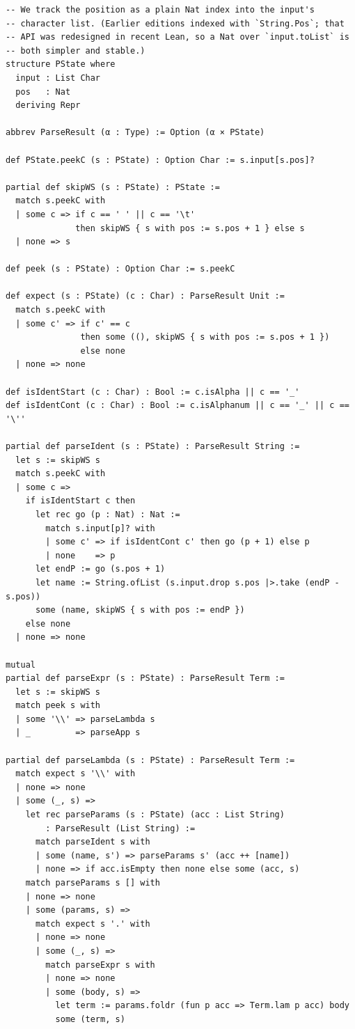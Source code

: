 \documentclass[11pt,a4paper]{article}
\theoremstyle{definition}
\begin{document}
\begin{verbatim}
-- We track the position as a plain Nat index into the input's
-- character list. (Earlier editions indexed with `String.Pos`; that
-- API was redesigned in recent Lean, so a Nat over `input.toList` is
-- both simpler and stable.)
structure PState where
  input : List Char
  pos   : Nat
  deriving Repr

abbrev ParseResult (α : Type) := Option (α × PState)

def PState.peekC (s : PState) : Option Char := s.input[s.pos]?

partial def skipWS (s : PState) : PState :=
  match s.peekC with
  | some c => if c == ' ' || c == '\t'
              then skipWS { s with pos := s.pos + 1 } else s
  | none => s

def peek (s : PState) : Option Char := s.peekC

def expect (s : PState) (c : Char) : ParseResult Unit :=
  match s.peekC with
  | some c' => if c' == c
               then some ((), skipWS { s with pos := s.pos + 1 })
               else none
  | none => none

def isIdentStart (c : Char) : Bool := c.isAlpha || c == '_'
def isIdentCont (c : Char) : Bool := c.isAlphanum || c == '_' || c == '\''

partial def parseIdent (s : PState) : ParseResult String :=
  let s := skipWS s
  match s.peekC with
  | some c =>
    if isIdentStart c then
      let rec go (p : Nat) : Nat :=
        match s.input[p]? with
        | some c' => if isIdentCont c' then go (p + 1) else p
        | none    => p
      let endP := go (s.pos + 1)
      let name := String.ofList (s.input.drop s.pos |>.take (endP - s.pos))
      some (name, skipWS { s with pos := endP })
    else none
  | none => none

mutual
partial def parseExpr (s : PState) : ParseResult Term :=
  let s := skipWS s
  match peek s with
  | some '\\' => parseLambda s
  | _         => parseApp s

partial def parseLambda (s : PState) : ParseResult Term :=
  match expect s '\\' with
  | none => none
  | some (_, s) =>
    let rec parseParams (s : PState) (acc : List String)
        : ParseResult (List String) :=
      match parseIdent s with
      | some (name, s') => parseParams s' (acc ++ [name])
      | none => if acc.isEmpty then none else some (acc, s)
    match parseParams s [] with
    | none => none
    | some (params, s) =>
      match expect s '.' with
      | none => none
      | some (_, s) =>
        match parseExpr s with
        | none => none
        | some (body, s) =>
          let term := params.foldr (fun p acc => Term.lam p acc) body
          some (term, s)


\end{verbatim}
\end{document}
